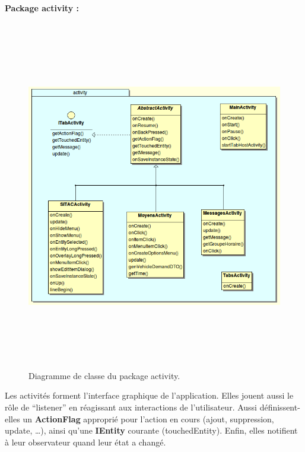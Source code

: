 \documentclass{article}
\begin{document}
\paragraph{Package activity :}
\begin{figure}[htbp]
\begin{center}
\includegraphics[height=433pt]{doc_dev-fig003.png}
\caption{Diagramme de classe du package activity.}
\end{center}
\end{figure}

Les activités forment l’interface graphique de l’application. Elles jouent aussi le rôle de “listener” en réagissant aux interactions de l’utilisateur. Aussi définissent-elles un \textbf{ActionFlag} approprié pour l’action en cours (ajout, suppression, update, …), ainsi qu’une \textbf{IEntity} courante (touchedEntity). Enfin, elles notifient à leur observateur quand leur état a changé.

\newpage
\end{document}
